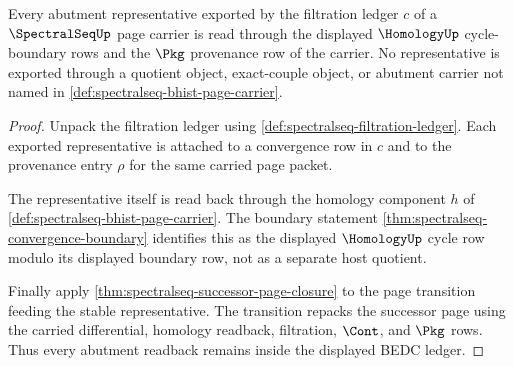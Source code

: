 \begin{theorem}
\label{thm:spectralseq-abutment-readback-boundary}
Every abutment representative exported by the filtration ledger
$c$ of a $\SpectralSeqUp$ page carrier is read through the displayed
$\HomologyUp$ cycle-boundary rows and the $\Pkg$ provenance row of the carrier.
No representative is exported through a quotient object, exact-couple object,
or abutment carrier not named in \autoref{def:spectralseq-bhist-page-carrier}.
\end{theorem}
\begin{proof}
Unpack the filtration ledger using
\autoref{def:spectralseq-filtration-ledger}. Each exported representative is
attached to a convergence row in $c$ and to the provenance entry $\rho$ for the
same carried page packet.

The representative itself is read back through the homology component $h$ of
\autoref{def:spectralseq-bhist-page-carrier}. The boundary statement
\autoref{thm:spectralseq-convergence-boundary} identifies this as the
displayed $\HomologyUp$ cycle row modulo its displayed boundary row, not as a
separate host quotient.

Finally apply \autoref{thm:spectralseq-successor-page-closure} to the page
transition feeding the stable representative. The transition repacks the
successor page using the carried differential, homology readback,
filtration, $\Cont$, and $\Pkg$ rows. Thus every abutment readback remains
inside the displayed BEDC ledger.
\end{proof}

